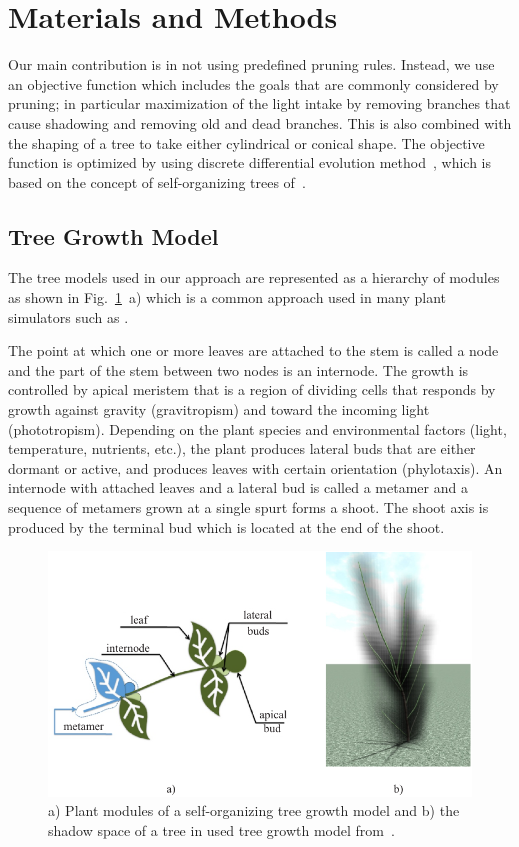\section{Materials and Methods}\label{sec:intro}
Our main contribution is in not using predefined pruning rules.
Instead, we use an objective function which includes the goals that are commonly considered by pruning; in particular maximization of the light intake by removing branches that cause shadowing and removing old and dead branches. This is also combined with the shaping of a tree to take either cylindrical or conical shape. 
The objective function is optimized by using discrete differential evolution method~\cite{kohek_eduapple:_2015}, which is based on the
concept of self-organizing trees of~\cite{palubicki_self-organizing_2009}.


\subsection{Tree Growth Model}
The tree models used in our approach are represented as a hierarchy of
modules as shown in Fig.~\ref{fig:my_figure1}~a) which is a common approach used in many plant
simulators such as \cite{de_reffye_plant_1988,palubicki_self-organizing_2009,pirk_plastic_2012,prusinkiewicz_development_1988,stava_inverse_2014}. 

The point at which one or more leaves are attached to the stem is called a node and the part of the stem between two nodes is an internode. 
The growth is controlled by apical meristem that is a region of dividing cells that responds by growth against gravity (gravitropism) and
toward the incoming light (phototropism).
Depending on the plant species and environmental factors (light, temperature, nutrients, etc.), the plant produces lateral buds that are either dormant or active, and produces leaves with certain orientation (phylotaxis).
An internode with attached leaves and a lateral bud is called a metamer and a sequence of metamers grown at a single spurt forms a shoot. 
The shoot axis is produced by the terminal bud which is located at the end of the shoot.
\begin{figure}[hbt]
    \centering
    \includegraphics[width=4.5in]{figs/Fig1}
    \caption{a) Plant modules of a self-organizing tree growth
model and b) the shadow space of a tree in used tree growth model from~\cite{kohek_eduapple:_2015}.}
    \label{fig:my_figure1}
\end{figure}

